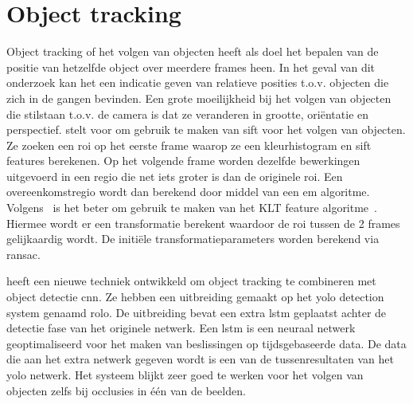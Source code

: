     \section{Object tracking}
        Object tracking of het volgen van objecten heeft als doel het bepalen van de positie van hetzelfde object over meerdere frames heen. In het geval van dit onderzoek kan het een indicatie geven van relatieve posities t.o.v. objecten die zich in de gangen bevinden.
        Een grote moeilijkheid bij het volgen van objecten die stilstaan t.o.v. de camera is dat ze veranderen in grootte, ori\"{e}ntatie en perspectief.
        \cite{Zhou2009} stelt voor om gebruik te maken van \gls{sift} voor het volgen van objecten. Ze zoeken een \gls{roi} op het eerste frame waarop ze een kleurhistogram en \gls{sift} features berekenen.
        Op het volgende frame worden dezelfde bewerkingen uitgevoerd in een regio die net iets groter is dan de originele \gls{roi}. Een overeenkomstregio wordt dan berekend door middel van een \gls{em} algoritme.
        Volgens~\cite{Baheti2016} is het beter om gebruik te maken van het KLT feature algoritme~\cite{tomasi1991detection}. Hiermee wordt er een transformatie berekent waardoor de \gls{roi} tussen de 2 frames gelijkaardig wordt. De initi\"{e}le transformatieparameters worden berekend via \gls{ransac}.

        \cite{Ning2017} heeft een nieuwe techniek ontwikkeld om object tracking te combineren met object detectie \gls{cnn}. Ze hebben een uitbreiding gemaakt op het \gls{yolo} detection system genaamd \gls{rolo}.
        De uitbreiding bevat een extra \gls{lstm} geplaatst achter de detectie fase van het originele netwerk. Een \gls{lstm} is een neuraal netwerk geoptimaliseerd voor het maken van beslissingen op tijdsgebaseerde data.
        De data die aan het extra netwerk gegeven wordt is een van de tussenresultaten van het \gls{yolo} netwerk.
        Het systeem blijkt zeer goed te werken voor het volgen van objecten zelfs bij occlusies in \'{e}\'{e}n van de beelden. 

